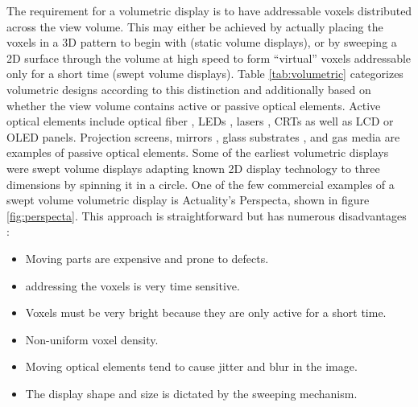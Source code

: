 The requirement for a volumetric display is to have addressable voxels distributed across the view volume. This may either be achieved by actually placing the voxels in a 3D pattern to begin with (static volume displays), or by sweeping a 2D surface through the volume at high speed to form ``virtual'' voxels addressable only for a short time (swept volume displays). Table \ref{tab:volumetric} categorizes volumetric designs according to this distinction and additionally based on whether the view volume contains active or passive optical elements. Active optical elements include optical fiber \cite{MacFarlane_1994}, LEDs \cite{Schipper_Coddington_1963}, lasers \cite{Momiuchi_Kimura_2009}, CRTs \cite{Ketchpel_1964} as well as LCD \cite{Sullivan_2004} or OLED \cite{Koo_Kim_2009} panels. Projection screens\cite{geng2013volumetric}, mirrors \cite{Sher_1978}, glass substrates \cite{Lewis_Verber_McGhee_1971}, and gas media \cite{Korevaar_Spivey_1989} are examples of passive optical elements. Some of the earliest volumetric displays were swept volume displays \cite{Max_1961, Schipper_Coddington_1963, Ketchpel_1964} adapting known 2D display technology to three dimensions by spinning it in a circle. One of the few commercial examples of a swept volume volumetric display is Actuality's Perspecta, shown in figure \ref{fig:perspecta}. This approach is straightforward but has numerous disadvantages \cite{Geng_2013}:

\begin{itemize}
    \item Moving parts are expensive and prone to defects.
    \item addressing the voxels is very time sensitive.
    \item Voxels must be very bright because they are only active for a short time.
    \item Non-uniform voxel density.
    \item Moving optical elements tend to cause jitter and blur in the image.
    \item The display shape and size is dictated by the sweeping mechanism.
\end{itemize}

